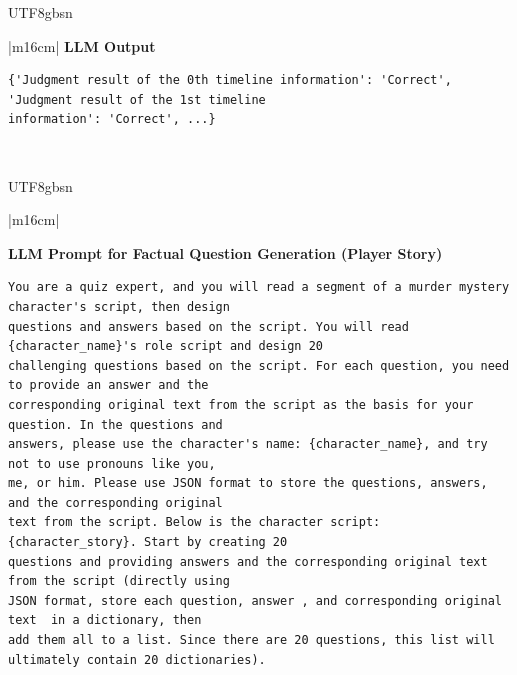 \documentclass[11pt]{article}
\begin{document}
{\begin{CJK}{UTF8}{gbsn}
\begin{table}[ht!]
\begin{minipage}[t]{\linewidth}
\begin{tabular}{|m{16cm}|}
\hline
{}  \textbf{LLM Output}  \\
\hline
\begin{minipage}[t]{\linewidth}
\small\begin{verbatim}
{'Judgment result of the 0th timeline information': 'Correct', 'Judgment result of the 1st timeline
information': 'Correct', ...}

\end{verbatim}
\end{minipage} \\
\hline
\end{tabular}
\caption{LLM prompts and outputs for self-verification (English Translation)}
\end{minipage}
\end{table}
\end{CJK}





\begin{CJK}{UTF8}{gbsn}
\begin{table}[ht!]
\centering
\begin{minipage}[t]{\linewidth}
\begin{tabular}{|m{16cm}|}
\hline

\hline
{}  {\textbf{LLM Prompt for Factual Question Generation (Player Story)}} \\
\begin{minipage}[t]{\linewidth}
\small\begin{verbatim}
You are a quiz expert, and you will read a segment of a murder mystery character's script, then design 
questions and answers based on the script. You will read {character_name}'s role script and design 20
challenging questions based on the script. For each question, you need to provide an answer and the 
corresponding original text from the script as the basis for your question. In the questions and 
answers, please use the character's name: {character_name}, and try not to use pronouns like you,
me, or him. Please use JSON format to store the questions, answers, and the corresponding original 
text from the script. Below is the character script: {character_story}. Start by creating 20 
questions and providing answers and the corresponding original text from the script (directly using
JSON format, store each question, answer , and corresponding original text  in a dictionary, then
add them all to a list. Since there are 20 questions, this list will ultimately contain 20 dictionaries).


\end{verbatim}
\end{minipage}
\end{tabular}
\end{minipage}
\end{table}
\end{CJK}}
\end{document}
